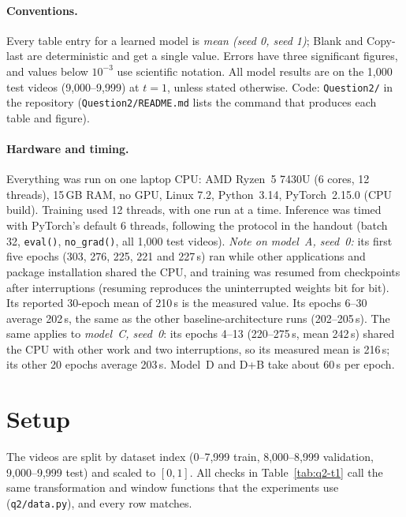 \setcounter{table}{0}
\setcounter{figure}{0}
\newcommand{\qa}[1]{\paragraph{Q2.#1}}
\newcommand{\Ex}[1]{E^{(#1)}}

\paragraph{Conventions.} Every table entry for a learned model is \emph{mean (seed 0, seed 1)};
Blank and Copy-last are deterministic and get a single value. Errors have three significant figures,
and values below $10^{-3}$ use scientific notation. All model results are on the 1,000 test videos
(9,000--9,999) at $t=1$, unless stated otherwise. Code: \texttt{Question2/} in the repository
(\texttt{Question2/README.md} lists the command that produces each table and figure).

\paragraph{Hardware and timing.} Everything was run on one laptop CPU: AMD Ryzen~5 7430U
(6 cores, 12 threads), 15\,GB RAM, no GPU, Linux 7.2, Python~3.14, PyTorch~2.15.0 (CPU build).
Training used 12 threads, with one run at a time. Inference was timed with PyTorch's default 6 threads,
following the protocol in the handout (batch 32, \texttt{eval()}, \texttt{no\_grad()}, all 1,000 test videos).
\emph{Note on model~A, seed~0:} its first five epochs (303, 276, 225, 221 and 227\,s) ran while other
applications and package installation shared the CPU, and training was resumed from checkpoints after
interruptions (resuming reproduces the uninterrupted weights bit for bit). Its reported 30-epoch mean of
210\,s is the measured value. Its epochs 6--30 average 202\,s, the same as the other baseline-architecture
runs (202--205\,s). The same applies to \emph{model~C, seed~0}: its epochs 4--13 (220--275\,s, mean 242\,s)
shared the CPU with other work and two interruptions, so its measured mean is 216\,s; its other 20 epochs
average 203\,s. Model~D and D+B take about 60\,s per epoch.

\section{Setup}
The videos are split by dataset index (0--7,999 train, 8,000--8,999 validation, 9,000--9,999 test)
and scaled to $[0,1]$. All checks in Table~\ref{tab:q2-t1} call the same transformation and window
functions that the experiments use (\texttt{q2/data.py}), and every row matches.


